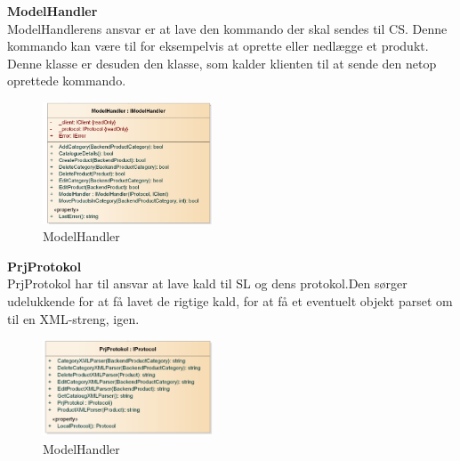 \textbf{ModelHandler}\\
ModelHandlerens ansvar er at lave den kommando der skal sendes til \gls{CS}. Denne kommando kan være til for eksempelvis at oprette eller nedlægge et produkt. Denne klasse er desuden den klasse, som kalder klienten til at sende den netop oprettede kommando. 
\begin{center}
\begin{figure}[!h]
    \centering
    \includegraphics[width=0.45\textwidth]{Systemdesign/backend/klassebeskrivelser/Images/ModelHandler.png}
    \caption{ModelHandler}
    \label{fig:modelhandlerreal}
\end{figure}
\end{center}
\label{Modelhandler_Beskrivelse}
 \bigskip
 
 
 
 
 

\textbf{PrjProtokol}\\
PrjProtokol har til ansvar at lave kald til \gls{SL} og dens protokol.Den sørger udelukkende for at få lavet de rigtige kald, for at få et eventuelt objekt parset om til en XML-streng, igen. \bigskip
\begin{center}
\begin{figure}[!h]
    \centering
    \includegraphics[width=0.45\textwidth]{Systemdesign/backend/klassebeskrivelser/Images/PrjProtokol.png}
    \caption{ModelHandler}
    \label{fig:prjprotko}
\end{figure}
\end{center}
\label{PrjProtokol_Beskrivelse}
 \bigskip
 




\bigskip
\bigskip




